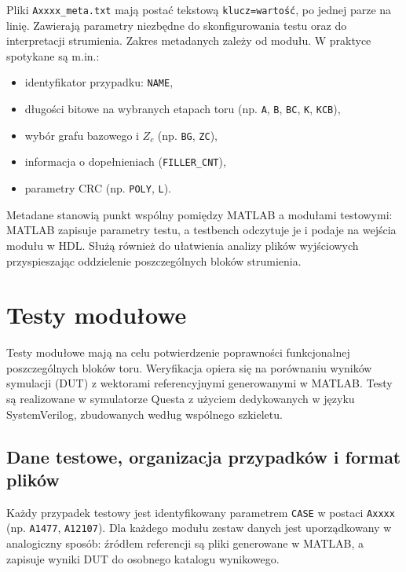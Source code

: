 Pliki \texttt{Axxxx\_meta.txt} mają postać tekstową \texttt{klucz=wartość}, po jednej parze na linię.
Zawierają parametry niezbędne do skonfigurowania testu oraz do interpretacji strumienia.
Zakres metadanych zależy od modułu. W praktyce spotykane są m.in.:
\begin{itemize}
    \item identyfikator przypadku: \texttt{NAME},
    \item długości bitowe na wybranych etapach toru (np. \texttt{A}, \texttt{B}, \texttt{BC}, \texttt{K}, \texttt{KCB}),
    \item wybór grafu bazowego i $Z_c$ (np. \texttt{BG}, \texttt{ZC}),
    \item informacja o dopełnieniach (\texttt{FILLER\_CNT}),
    \item parametry CRC (np. \texttt{POLY}, \texttt{L}).
\end{itemize}

Metadane stanowią punkt wspólny pomiędzy MATLAB a modułami testowymi: MATLAB zapisuje parametry testu,
a testbench odczytuje je i podaje na wejścia modułu w HDL. Służą również do ułatwienia analizy plików wyjściowych przyspieszając oddzielenie poszczególnych bloków strumienia.

\section{Testy modułowe}
\label{sec:testy_modulowe}

Testy modułowe mają na celu potwierdzenie poprawności funkcjonalnej poszczególnych bloków toru.
Weryfikacja opiera się na porównaniu wyników symulacji (DUT) z wektorami referencyjnymi generowanymi w MATLAB.
Testy są realizowane w symulatorze Questa z użyciem dedykowanych  w języku SystemVerilog,
zbudowanych według wspólnego szkieletu.

\subsection{Dane testowe, organizacja przypadków i format plików}
\label{subsec:test_data_organization}

Każdy przypadek testowy jest identyfikowany parametrem \texttt{CASE} w postaci \texttt{Axxxx}
(np. \texttt{A1477}, \texttt{A12107}).
Dla każdego modułu zestaw danych jest uporządkowany w analogiczny sposób: źródłem referencji są pliki generowane w MATLAB,
a  zapisuje wyniki DUT do osobnego katalogu wynikowego.

